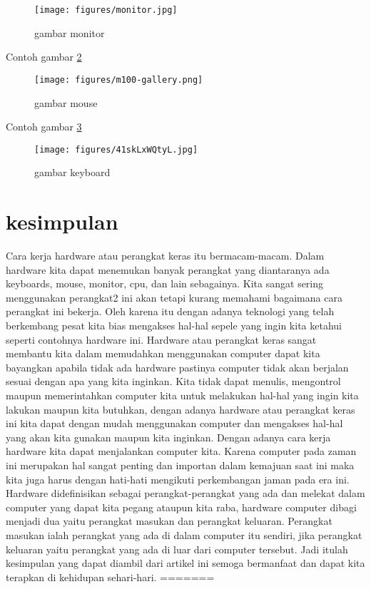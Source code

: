 \begin{figure}[ht]
\centerline{\texttt{[image: figures/monitor.jpg]}}
\caption{gambar monitor}
\label{monitor.jpg}
\end{figure}

Contoh gambar \ref{m100-gallery.png}

\begin{figure}[ht]
\centerline{\texttt{[image: figures/m100-gallery.png]}}
\caption{gambar mouse}
\label{m100-gallery.png}
\end{figure}

Contoh gambar \ref{41skLxWQtyL.jpg}

\begin{figure}[ht]
\centerline{\texttt{[image: figures/41skLxWQtyL.jpg]}}
\caption{gambar keyboard}
\label{41skLxWQtyL.jpg}
\end{figure}

\section {kesimpulan}
Cara kerja hardware atau perangkat keras itu bermacam-macam. Dalam hardware kita dapat menemukan banyak perangkat yang diantaranya ada keyboards, mouse, monitor, cpu, dan lain sebagainya. Kita sangat sering menggunakan perangkat2 ini akan tetapi kurang memahami bagaimana cara perangkat ini bekerja. Oleh karena itu dengan adanya teknologi yang telah berkembang pesat kita bias mengakses hal-hal sepele yang ingin kita ketahui seperti contohnya hardware ini. Hardware atau perangkat keras sangat membantu kita dalam memudahkan menggunakan computer dapat kita bayangkan apabila tidak ada hardware pastinya computer tidak akan berjalan sesuai dengan apa yang kita inginkan. Kita tidak dapat menulis, mengontrol maupun memerintahkan computer kita untuk melakukan hal-hal yang ingin kita lakukan maupun kita butuhkan, dengan adanya hardware atau perangkat keras ini kita dapat dengan mudah menggunakan computer dan mengakses hal-hal yang akan kita gunakan maupun kita inginkan. Dengan adanya cara kerja hardware kita dapat menjalankan computer kita. Karena computer pada zaman ini merupakan hal sangat penting dan importan dalam kemajuan saat ini maka kita juga harus dengan hati-hati mengikuti perkembangan jaman pada era ini. Hardware didefinisikan sebagai perangkat-perangkat yang ada dan melekat dalam computer yang dapat kita pegang ataupun kita raba, hardware computer dibagi menjadi dua yaitu perangkat masukan dan perangkat keluaran. Perangkat masukan ialah perangkat yang ada di dalam computer itu sendiri, jika perangkat keluaran yaitu perangkat yang ada di luar dari computer tersebut. Jadi itulah kesimpulan yang dapat diambil dari artikel ini semoga bermanfaat dan dapat kita terapkan di kehidupan sehari-hari.
=======

